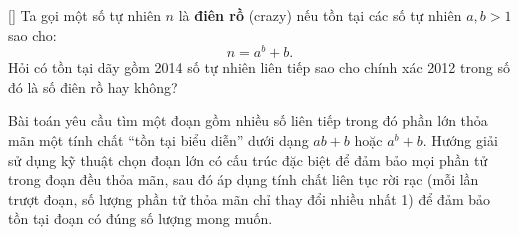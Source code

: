 \documentclass[../09-contruction-methods.tex]{subfiles}
\begin{document}

\begin{example*}\label{example:SRB-2014-MO-P4}[\textbf{}]
    Ta gọi một số tự nhiên \( n \) là \textbf{điên rồ} (crazy) nếu tồn tại các số tự nhiên \( a, b > 1 \) sao cho:
    \[
        n = a^b + b.
    \]
    Hỏi có tồn tại dãy gồm 2014 số tự nhiên liên tiếp sao cho chính xác 2012 trong số đó là số điên rồ hay không?
\end{example*}

\begin{story*}
    Bài toán yêu cầu tìm một đoạn gồm nhiều số liên tiếp trong đó phần lớn thỏa mãn một tính chất “tồn tại biểu diễn” dưới dạng \( ab + b \) hoặc \( a^b + b \).
    Hướng giải sử dụng kỹ thuật chọn đoạn lớn có cấu trúc đặc biệt để đảm bảo mọi phần tử trong đoạn đều thỏa mãn,
    sau đó áp dụng tính chất liên tục rời rạc (mỗi lần trượt đoạn, số lượng phần tử thỏa mãn chỉ thay đổi nhiều nhất 1)
    để đảm bảo tồn tại đoạn có đúng số lượng mong muốn.
\end{story*}

\bigbreak
\end{document}
